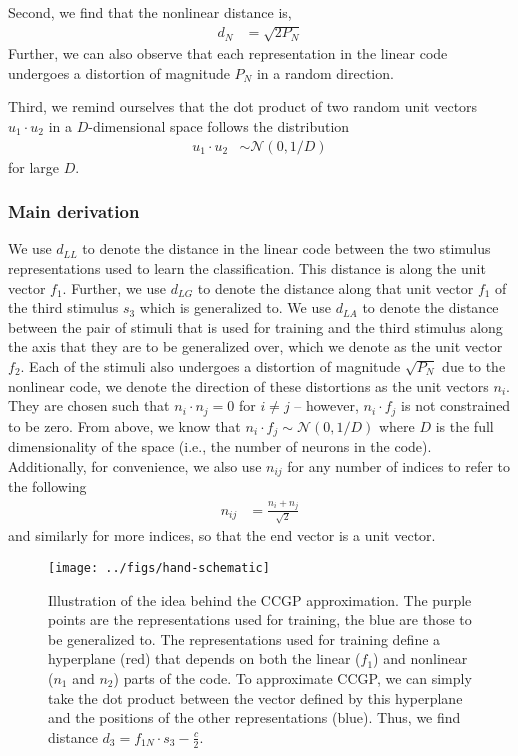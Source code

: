\documentclass[letter,12pt]{article}
\newcommand{\dll}{d_{LL}}
\newcommand{\dlg}{d_{LG}}
\newcommand{\dla}{d_{LA}}
\newcommand{\dis}{\mathcal{N}(0, 1/D)}
\begin{document}
Second, we find that the nonlinear distance is,
\begin{align}
  d_{N} &= \sqrt{2 P_{N}}
\end{align}
Further, we can also observe that each representation in the linear code
undergoes a distortion of magnitude $P_{N}$ in a random direction.

Third, we remind ourselves that the dot product of two random unit vectors
$u_{1} \cdot u_{2}$ in a $D$-dimensional space follows the distribution
\begin{align}
  u_{1} \cdot u_{2} &\sim \dis
\end{align}
for large $D$.

\subsubsection{Main derivation}
We use $\dll$ to denote the distance in the linear code between the two
stimulus representations used to learn the classification. This distance is
along the unit vector $f_{1}$. Further, we use $\dlg$ to denote the distance
along that unit vector $f_{1}$ of the third stimulus $s_{3}$ which is generalized
to. We use $\dla$ to
denote the distance between the pair of stimuli that is used for training and
the third stimulus along the axis that they are
to be generalized over, which we denote as the unit vector $f_{2}$. Each of the
stimuli also undergoes a distortion of magnitude $\sqrt{P_{N}}$ due to the
nonlinear code, we denote the direction of these distortions as the unit
vectors $n_{i}$. They are chosen such that
$n_{i} \cdot n_{j} = 0$ for $i \ne j$ -- however, $n_{i} \cdot f_{j}$ is not
constrained to be zero. From above, we know that
$n_{i} \cdot f_{j} \sim \dis$ where $D$ is the
full dimensionality of the space (i.e., the number of neurons in the code).
Additionally, for convenience, we also use $n_{ij}$ for any number of indices
to refer to the following
\begin{align}
  n_{ij} &= \frac{n_{i} + n_{j}}{\sqrt{2}}
\end{align}
and similarly for more indices, so that the end vector is a unit vector.

\begin{figure}[ht!]
  \begin{center}
    \texttt{[image: ../figs/hand-schematic]}
  \end{center}
  \caption[Illustration of the idea behind the CCGP approximation.]
          {Illustration of the idea behind the CCGP approximation.
            The purple points are the representations used for training, the
            blue are those to be generalized to. The representations used
            for training define a hyperplane (red) that depends on both the
            linear ($f_{1}$) and nonlinear ($n_{1}$ and $n_{2}$) parts of
            the code. To approximate CCGP, we can simply take the dot product
            between the vector defined by this hyperplane and the positions of
            the other representations (blue). Thus, we find distance
            $d_{3} = f_{1N} \cdot s_{3} - \frac{c}{2}$. 
  }
  \label{schem}
\end{figure}
\end{document}
